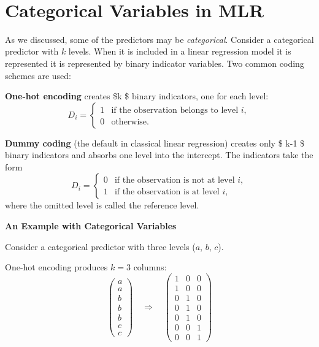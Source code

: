 \documentclass[
]{book}
\begin{document}
~

\section{Categorical Variables in MLR}\label{categorical-variables-in-mlr}

As we discussed, some of the predictors may be \emph{categorical}. Consider a categorical predictor with \(k\) levels. When it is included in a linear regression model it is represented it is represented by binary indicator variables. Two common coding schemes are used:

\textbf{One-hot encoding} creates \$k \$ binary indicators, one for each level:
\[D_i =
\begin{cases}
1 & \text{if the observation belongs to level } i, \\
0 & \text{otherwise}.
\end{cases}\]

\textbf{Dummy coding} (the default in classical linear regression) creates only \$ k-1 \$ binary indicators and absorbs one level into the intercept. The indicators take the form
\[D_i =
\begin{cases}
0 & \text{if the observation is not at level } i, \\
1 & \text{if the observation is at level } i,
\end{cases}\]
where the omitted level is called the reference level.

\textbf{An Example with Categorical Variables}

Consider a categorical predictor with three levels (\(a\), \(b\), \(c\)).

One-hot encoding produces \(k = 3\) columns:
\[\begin{pmatrix}
a \\ a \\ b \\ b \\ b \\ c \\ c
\end{pmatrix}
\quad\Longrightarrow\quad
\begin{pmatrix}
1 & 0 & 0 \\
1 & 0 & 0 \\
0 & 1 & 0 \\
0 & 1 & 0 \\
0 & 1 & 0 \\
0 & 0 & 1 \\
0 & 0 & 1
\end{pmatrix}\]
\end{document}
